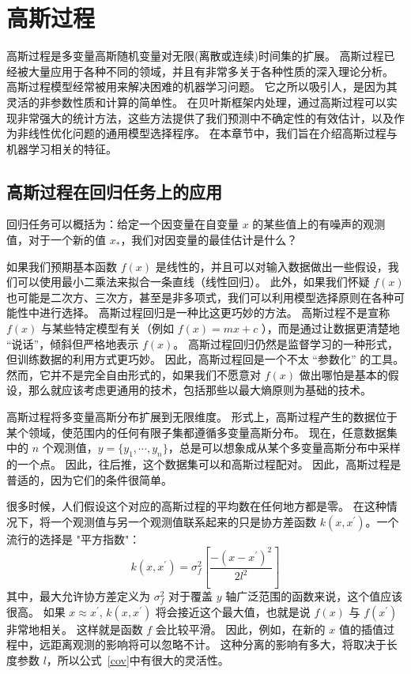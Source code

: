 \documentclass[degree=project, degree-type=project]{thuthesis}
\begin{document}
\chapter{高斯过程}
\label{chap:gp}

高斯过程是多变量高斯随机变量对无限(离散或连续)时间集的扩展。
高斯过程已经被大量应用于各种不同的领域，并且有非常多关于各种性质的深入理论分析。
高斯过程模型经常被用来解决困难的机器学习问题。
它之所以吸引人，是因为其灵活的非参数性质和计算的简单性。
在贝叶斯框架内处理，通过高斯过程可以实现非常强大的统计方法，这些方法提供了我们预测中不确定性的有效估计，以及作为非线性优化问题的通用模型选择程序。
在本章节中，我们旨在介绍高斯过程与机器学习相关的特征。

\section{高斯过程在回归任务上的应用}

回归任务可以概括为：给定一个因变量在自变量 $x$ 的某些值上的有噪声的观测值，对于一个新的值 $x_*$，我们对因变量的最佳估计是什么？

如果我们预期基本函数 $f(x)$ 是线性的，并且可以对输入数据做出一些假设，我们可以使用最小二乘法来拟合一条直线（线性回归）。
此外，如果我们怀疑 $f(x)$ 也可能是二次方、三次方，甚至是非多项式，我们可以利用模型选择原则在各种可能性中进行选择。
高斯过程回归是一种比这更巧妙的方法。
高斯过程不是宣称 $f(x)$ 与某些特定模型有关（例如 $f(x)=mx+c$ ），而是通过让数据更清楚地 “说话”，倾斜但严格地表示 $f(x)$。
高斯过程回归仍然是监督学习的一种形式，但训练数据的利用方式更巧妙。
因此，高斯过程回是一个不太 “参数化” 的工具。
然而，它并不是完全自由形式的，如果我们不愿意对 $f(x)$ 做出哪怕是基本的假设，那么就应该考虑更通用的技术，包括那些以最大熵原则为基础的技术。

高斯过程将多变量高斯分布扩展到无限维度。
形式上，高斯过程产生的数据位于某个领域，使范围内的任何有限子集都遵循多变量高斯分布。
现在，任意数据集中的 $n$ 个观测值，$y = \{y_1, \cdots, y_n\}$，总是可以想象成从某个多变量高斯分布中采样的一个点。
因此，往后推，这个数据集可以和高斯过程配对。
因此，高斯过程是普适的，因为它们的条件很简单。

很多时候，人们假设这个对应的高斯过程的平均数在任何地方都是零。
在这种情况下，将一个观测值与另一个观测值联系起来的只是协方差函数 $k(x, x^\prime)$。一个流行的选择是 "平方指数"：
\begin{equation}\label{cov}
k(x, x^\prime) = \sigma_f^2 \left[\frac{- (x - x^\prime)^2}{2l^2}\right]
\end{equation}
其中，最大允许协方差定义为 $\sigma_f^2$ 对于覆盖 $y$ 轴广泛范围的函数来说，这个值应该很高。
如果 $x \approx x^\prime$, $k(x, x^\prime)$ 将会接近这个最大值，也就是说 $f(x)$ 与 $f(x^\prime)$ 非常地相关。
这样就是函数 $f$ 会比较平滑。
因此，例如，在新的 $x$ 值的插值过程中，远距离观测的影响将可以忽略不计。
这种分离的影响有多大，将取决于长度参数 $l$，所以公式~\ref{cov}中有很大的灵活性。
\end{document}

